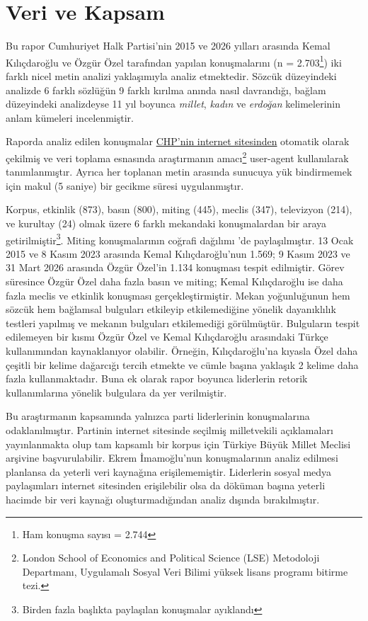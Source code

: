 \section{Veri ve Kapsam}

Bu rapor Cumhuriyet Halk Partisi'nin 2015 ve 2026 yılları arasında Kemal 
Kılıçdaroğlu ve Özgür Özel tarafından yapılan konuşmalarını (n = 2.703\footnote{Ham konuşma sayısı = 2.744}) iki farklı nicel metin analizi yaklaşımıyla analiz etmektedir. 
Sözcük düzeyindeki analizde 6 farklı sözlüğün 9 farklı kırılma anında nasıl davrandığı,
bağlam düzeyindeki analizdeyse 11 yıl boyunca \textit{millet}, \textit{kadın} ve \textit{erdoğan} kelimelerinin
anlam kümeleri incelenmiştir.

Raporda analiz edilen konuşmalar \href{https://chp.org.tr}{CHP'nin internet sitesinden} otomatik olarak çekilmiş ve
veri toplama esnasında araştırmanın amacı\footnote{London School of Economics and Political Science (LSE) Metodoloji Departmanı, Uygulamalı Sosyal Veri Bilimi yüksek lisans programı bitirme tezi.} user-agent kullanılarak tanımlanmıştır. Ayrıca her toplanan metin arasında
sunucuya yük bindirmemek için makul (5 saniye) bir gecikme süresi uygulanmıştır. 

Korpus, etkinlik (873), basın (800), miting (445), meclis (347), televizyon (214), ve kurultay (24)
olmak üzere 6 farklı mekandaki konuşmalardan bir araya getirilmiştir\footnote{Birden fazla başlıkta paylaşılan konuşmalar ayıklandı}.
Miting konuşmalarının coğrafi dağılımı 'de paylaşılmıştır.
13 Ocak 2015 ve 8 Kasım 2023 arasında Kemal Kılıçdaroğlu'nun 1.569; 9 Kasım 2023 ve 31 Mart 2026 arasında Özgür Özel'in 1.134 konuşması tespit edilmiştir. 
Görev süresince Özgür Özel daha fazla basın ve miting; Kemal Kılıçdaroğlu ise daha fazla meclis ve etkinlik konuşması gerçekleştirmiştir.
Mekan yoğunluğunun hem sözcük hem bağlamsal bulguları etkileyip etkilemediğine yönelik dayanıklılık testleri yapılmış ve mekanın bulguları etkilemediği görülmüştür.
Bulguların tespit edilemeyen bir kısmı Özgür Özel ve Kemal Kılıçdaroğlu arasındaki Türkçe kullanımından kaynaklanıyor olabilir. Örneğin, Kılıçdaroğlu'na kıyasla Özel daha
çeşitli bir kelime dağarcığı tercih etmekte ve cümle başına yaklaşık 2 kelime daha fazla kullanmaktadır. Buna ek olarak rapor boyunca liderlerin retorik kullanımlarına yönelik bulgulara da yer verilmiştir.


Bu araştırmanın kapsamında yalnızca parti liderlerinin konuşmalarına odaklanılmıştır.
Partinin internet sitesinde seçilmiş milletvekili açıklamaları yayınlanmakta olup tam kapsamlı bir korpus için Türkiye Büyük Millet Meclisi arşivine başvurulabilir.
Ekrem İmamoğlu'nun konuşmalarının analiz edilmesi planlansa da yeterli veri kaynağına erişilememiştir. Liderlerin sosyal medya 
paylaşımları internet sitesinden erişilebilir olsa da döküman başına yeterli hacimde bir veri kaynağı oluşturmadığından analiz dışında bırakılmıştır.


